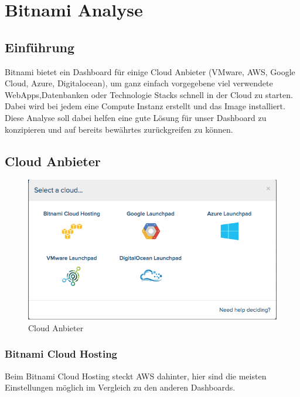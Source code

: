 \newpage
\section{Bitnami Analyse}
\subsection{Einführung}
 
Bitnami bietet ein Dashboard für einige Cloud Anbieter (VMware, AWS, Google Cloud, Azure, 
Digitalocean), um ganz einfach vorgegebene viel verwendete WebApps,Datenbanken oder Technologie Stacks 
schnell in der Cloud zu starten.
Dabei wird bei jedem eine Compute Instanz erstellt und das Image installiert.
Diese Analyse soll dabei helfen eine gute Lösung für unser Dashboard zu 
konzipieren und auf bereits bewährtes zurückgreifen zu können.

\subsection{Cloud Anbieter}
\begin{figure}[!htbp]
\includegraphics[width=\textwidth]{./03_Analyse/03_Bitnami/images/clouds}
  \caption{Cloud Anbieter}
\end{figure}

\newpage
\subsubsection{Bitnami Cloud Hosting\autocite{aws}}

Beim Bitnami Cloud Hosting steckt AWS dahinter, hier sind die meisten 
Einstellungen möglich im Vergleich zu den anderen Dashboards.

